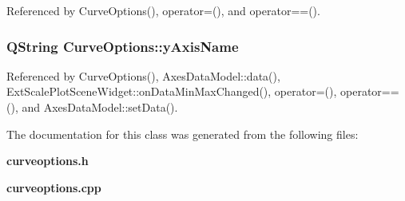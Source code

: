 Referenced by Curve\+Options(), operator=(), and operator==().

\subsubsection[{y\+Axis\+Name}]{\setlength{\rightskip}{0pt plus 5cm}Q\+String Curve\+Options\+::y\+Axis\+Name}\label{classCurveOptions_a623d8ba4f0e5da307becb3ed164ca499}


Referenced by Curve\+Options(), Axes\+Data\+Model\+::data(), Ext\+Scale\+Plot\+Scene\+Widget\+::on\+Data\+Min\+Max\+Changed(), operator=(), operator==(), and Axes\+Data\+Model\+::set\+Data().



The documentation for this class was generated from the following files\+:\begin{DoxyCompactItemize}
\item 
{\bf curveoptions.\+h}\item 
{\bf curveoptions.\+cpp}\end{DoxyCompactItemize}
